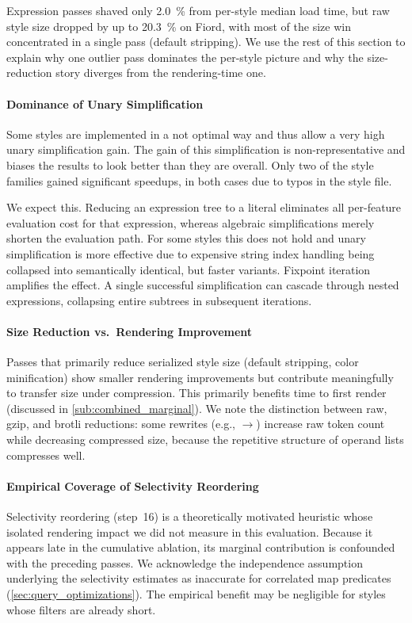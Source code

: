 Expression passes shaved only \qty{2.0}{\percent} from per-style median load time, but raw style size dropped by up to \qty{20.3}{\percent} on Fiord, with most of the size win concentrated in a single pass (default stripping).
We use the rest of this section to explain why one outlier pass dominates the per-style picture and why the size-reduction story diverges from the rendering-time one.

\paragraph{Dominance of Unary Simplification}
Some styles are implemented in a not optimal way and thus allow a very high unary simplification gain.
The gain of this simplification is non-representative and biases the results to look better than they are overall.
Only two of the style families gained significant speedups, in both cases due to typos in the style file.

We expect this.
Reducing an expression tree to a literal eliminates all per-feature evaluation cost for that expression, whereas algebraic simplifications merely shorten the evaluation path.
For some styles this does not hold and unary simplification is more effective due to expensive string index handling being collapsed into semantically identical, but faster variants.
Fixpoint iteration amplifies the effect.
A single successful simplification can cascade through nested expressions, collapsing entire subtrees in subsequent iterations.

\paragraph{Size Reduction vs.\ Rendering Improvement}
Passes that primarily reduce serialized style size (default stripping, color minification) show smaller rendering improvements but contribute meaningfully to transfer size under compression.
This primarily benefits time to first render (discussed in \cref{sub:combined_marginal}).
We note the distinction between raw, gzip, and brotli reductions: some rewrites (e.g., $\to$) increase raw token count while decreasing compressed size, because the repetitive structure of  operand lists compresses well.

\paragraph{Empirical Coverage of Selectivity Reordering}
Selectivity reordering (step~16) is a theoretically motivated heuristic whose isolated rendering impact we did not measure in this evaluation.
Because it appears late in the cumulative ablation, its marginal contribution is confounded with the preceding passes.
We acknowledge the independence assumption underlying the selectivity estimates as inaccurate for correlated map predicates (\cref{sec:query_optimizations}).
The empirical benefit may be negligible for styles whose filters are already short.

